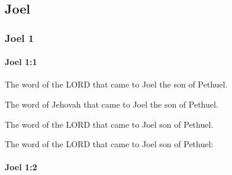 \subsection{Joel}
	\label{JOEL}

	\subsubsection{Joel 1} %
		\label{JOEL-1}

		\paragraph{Joel 1:1} %
			\label{JOEL-1-1}

			The word of the LORD that came to Joel the son of Pethuel.

			\begin{versebox}
					\item[BHS] 
					\item[LXX] 
					\item[ASV] The word of Jehovah that came to Joel the son of Pethuel.
					\item[NIV] The word of the LORD that came to Joel son of Pethuel.
					\item[NRSV] The word of the LORD that came to Joel son of Pethuel:
			\end{versebox}

		\paragraph{Joel 1:2} %
			\label{JOEL-1-2}

